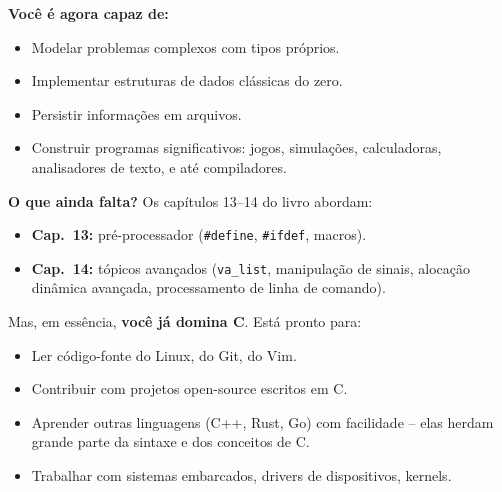 \documentclass[12pt,a4paper]{article}
\begin{document}
\begin{tcolorbox}[colback=deitellightblue,colframe=deitelblue,
  title={\bfseries 12 capítulos, uma jornada completa}]
\textbf{Você é agora capaz de:}
\begin{itemize}[noitemsep]
  \item Modelar problemas complexos com tipos próprios.
  \item Implementar estruturas de dados clássicas do zero.
  \item Persistir informações em arquivos.
  \item Construir programas significativos: jogos, simulações, calculadoras,
  analisadores de texto, e até compiladores.
\end{itemize}

\textbf{O que ainda falta?} Os capítulos 13--14 do livro abordam:
\begin{itemize}[noitemsep]
  \item \textbf{Cap.~13:} pré-processador (\texttt{\#define}, \texttt{\#ifdef},
  macros).
  \item \textbf{Cap.~14:} tópicos avançados (\texttt{va\_list}, manipulação de
  sinais, alocação dinâmica avançada, processamento de linha de comando).
\end{itemize}

Mas, em essência, \textbf{você já domina C}. Está pronto para:
\begin{itemize}[noitemsep]
  \item Ler código-fonte do Linux, do Git, do Vim.
  \item Contribuir com projetos open-source escritos em C.
  \item Aprender outras linguagens (C++, Rust, Go) com facilidade -- elas
  herdam grande parte da sintaxe e dos conceitos de C.
  \item Trabalhar com sistemas embarcados, drivers de dispositivos, kernels.
\end{itemize}

\end{tcolorbox}

\newpage
\end{document}
